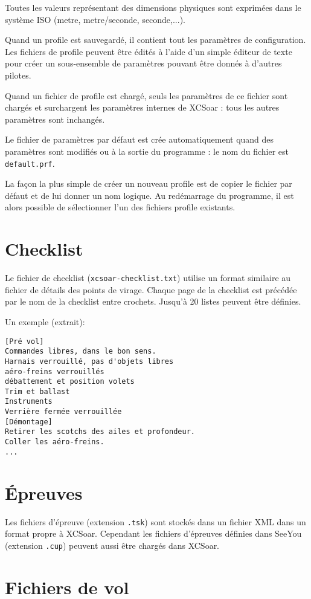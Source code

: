 Toutes les valeurs représentant des dimensions physiques sont exprimées dans le système ISO (metre, metre/seconde, seconde,...).

Quand un profile est sauvegardé, il contient tout les paramètres de configuration. Les fichiers de profile peuvent être édités à l'aide d'un simple éditeur de texte pour créer un sous-ensemble de paramètres pouvant être donnés à d'autres pilotes.

Quand un fichier de profile est chargé, seuls les paramètres de ce fichier sont chargés et surchargent les paramètres internes de XCSoar : tous les autres paramètres sont inchangés.

Le fichier de paramètres par défaut est crée automatiquement quand des paramètres sont modifiés ou à la sortie du programme : le nom du fichier est \verb|default.prf|.

La façon la plus simple de créer un nouveau profile est de copier le fichier par défaut et de lui donner un nom logique. Au redémarrage du programme, il est alors possible de sélectionner l'un des fichiers profile existants.


\section{Checklist}
Le fichier de checklist (\verb|xcsoar-checklist.txt|) utilise un format similaire au fichier de détails des points de virage. Chaque page de la checklist est précédée par le nom de la checklist entre crochets. Jusqu'à 20 listes peuvent être définies.

Un exemple (extrait):
\begin{verbatim}
[Pré vol]
Commandes libres, dans le bon sens.
Harnais verrouillé, pas d'objets libres
aéro-freins verrouillés
débattement et position volets
Trim et ballast
Instruments
Verrière fermée verrouillée
[Démontage]
Retirer les scotchs des ailes et profondeur.
Coller les aéro-freins.
...
\end{verbatim}

\section{Épreuves}

Les fichiers d'épreuve (extension \verb|.tsk|) sont stockés dans un fichier XML dans un format propre à XCSoar. Cependant les fichiers d'épreuves définies dans SeeYou  (extension \verb|.cup|) peuvent aussi être chargés dans XCSoar.


\section{Fichiers de vol} \label{sec:logfiles}

